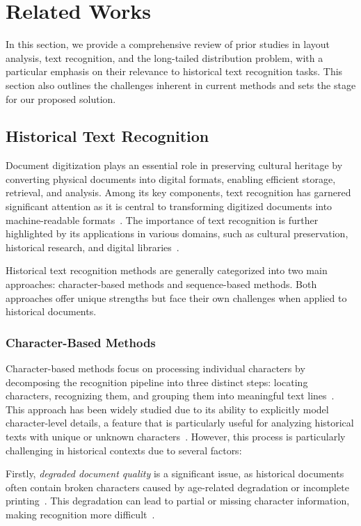 \section{Related Works}
\label{sec:related_works}

In this section, we provide a comprehensive review of prior studies in layout analysis, text recognition, and the long-tailed distribution problem, with a particular emphasis on their relevance to historical text recognition tasks. This section also outlines the challenges inherent in current methods and sets the stage for our proposed solution.

\subsection{Historical Text Recognition}

Document digitization plays an essential role in preserving cultural heritage by converting physical documents into digital formats, enabling efficient storage, retrieval, and analysis. Among its key components, text recognition has garnered significant attention as it is central to transforming digitized documents into machine-readable formats~\cite{jla}. The importance of text recognition is further highlighted by its applications in various domains, such as cultural preservation, historical research, and digital libraries~\cite{docdig, cultpres}.

Historical text recognition methods are generally categorized into two main approaches: character-based methods and sequence-based methods. Both approaches offer unique strengths but face their own challenges when applied to historical documents.

\subsubsection{Character-Based Methods}
Character-based methods focus on processing individual characters by decomposing the recognition pipeline into three distinct steps: locating characters, recognizing them, and grouping them into meaningful text lines~\cite{papytwin}. This approach has been widely studied due to its ability to explicitly model character-level details, a feature that is particularly useful for analyzing historical texts with unique or unknown characters~\cite{charan, histext}. However, this process is particularly challenging in historical contexts due to several factors:

Firstly, \textit{degraded document quality} is a significant issue, as historical documents often contain broken characters caused by age-related degradation or incomplete printing~\cite{broken}. This degradation can lead to partial or missing character information, making recognition more difficult~\cite{damagedoc}.


